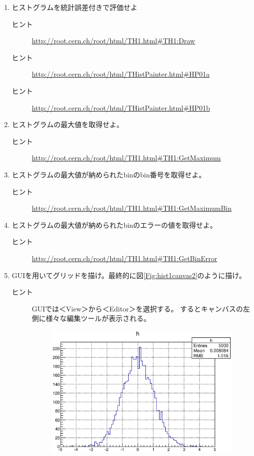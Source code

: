 \documentclass{jarticle}
\begin{document}
  \begin{enumerate}
   \item ヒストグラムを統計誤差付きで評価せよ
	 \begin{description}
	  \item[ヒント] \url{http://root.cern.ch/root/html/TH1.html#TH1:Draw}
	  \item[ヒント] \url{http://root.cern.ch/root/html/THistPainter.html#HP01a}
	  \item[ヒント] \url{http://root.cern.ch/root/html/THistPainter.html#HP01b}
	 \end{description}
   \item ヒストグラムの最大値を取得せよ。
	 \begin{description}
	  \item[ヒント] \url{http://root.cern.ch/root/html/TH1.html#TH1:GetMaximum}
	 \end{description}
   \item ヒストグラムの最大値が納められたbinのbin番号を取得せよ。
	 \begin{description}
	  \item[ヒント] \url{http://root.cern.ch/root/html/TH1.html#TH1:GetMaximumBin}
	 \end{description}
   \item ヒストグラムの最大値が納められたbinのエラーの値を取得せよ。
	 \begin{description}
	  \item[ヒント] \url{http://root.cern.ch/root/html/TH1.html#TH1:GetBinError}
	 \end{description}
   \item GUIを用いてグリッドを描け。最終的に図\ref{Fig:hist1canvas2}のように描け。
	 \begin{description}
	  \item[ヒント] GUIでは＜View＞から＜Editor＞を選択する。
		     するとキャンバスの左側に様々な編集ツールが表示される。
		     \begin{figure}[htbp]
		      \begin{center}
		       \includegraphics[width = 100mm]{./picture/hist1canvas2.eps}

\end{center}
\end{figure}
\end{description}
\end{enumerate}
\end{document}
